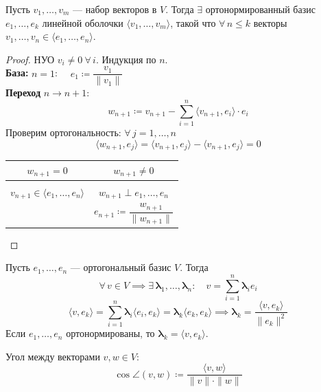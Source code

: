 \newpage

\begin{theorem}
    Пусть $v_1, \dots, v_m$ --- набор векторов в $V$. Тогда $\exists$ ортонормированный базис $e_1, \dots, e_k$
    линейной оболочки $\langle v_1,\dots, v_m\rangle$, такой что $\forall\, n \le k$ векторы $v_1, \dots, v_n \in \langle e_1, \dots, e_n\rangle$.
    \begin{proof}
        НУО $v_i \neq 0\ \forall\, i$. Индукция по $n$.\\[4pt]
        \textbf{База:} $n = 1$: $\quad e_1 \coloneqq \dfrac{v_1}{\|v_1\|}$\\[6pt]
        \textbf{Переход} $n \to n+1$:
        \[
            w_{n+1} \coloneqq v_{n+1} - \sum_{i=1}^{n} \langle v_{n+1}, e_i \rangle \cdot e_i
        \]
        Проверим ортогональность: $\forall\, j = 1,\dots,n$
        \[
            \langle w_{n+1}, e_j \rangle = \langle v_{n+1}, e_j \rangle - \langle v_{n+1}, e_j \rangle = 0
        \]
        \begin{center}
        \begin{tabular}{c|c}
            $w_{n+1} = 0$ & $w_{n+1} \neq 0$ \\[4pt]
            \hline\\[-6pt]
            $v_{n+1} \in \langle e_1, \dots, e_n \rangle$ & $w_{n+1} \perp e_1, \dots, e_n$ \\[6pt]
            & $e_{n+1} \coloneqq \dfrac{w_{n+1}}{\|w_{n+1}\|}$ \\[8pt]
        \end{tabular}
        \end{center}
    \end{proof}
\end{theorem}


\begin{stmt}
    Пусть $e_1, \dots, e_n$ --- ортогональный базис $V$. Тогда
    \[
        \forall\, v \in V \implies \exists\, \mathbf{\lambda}_1, \dots, \mathbf{\lambda}_n : \quad v = \sum_{i=1}^{n} \mathbf{\lambda}_i e_i
    \]
    \[
        \langle v, e_k \rangle = \sum_{i=1}^{n} \mathbf{\lambda}_i \langle e_i, e_k \rangle = \mathbf{\lambda}_k \langle e_k, e_k \rangle
        \implies
        \boxed{\mathbf{\lambda}_k = \frac{\langle v, e_k \rangle}{\|e_k\|^2}}
    \]
    Если $e_1, \dots, e_n$ ортонормированы, то $\boxed{\mathbf{\lambda}_k = \langle v, e_k \rangle}$.
\end{stmt}


\begin{definition}
    Угол между векторами $v, w \in V$:
    \[
        \cos \angle(v, w) \coloneqq \frac{\langle v, w \rangle}{\|v\| \cdot \|w\|}
    \]
\end{definition}


